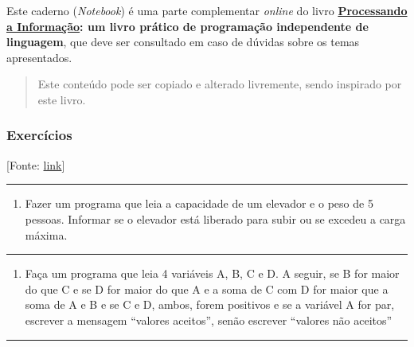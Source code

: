\documentclass[12pt,a4paper]{article}
\renewcommand{\linethickness}{0.05em}
\providecommand{\tightlist}{%
      \setlength{\itemsep}{0pt}\setlength{\parskip}{0pt}}
\begin{document}
Este caderno (\emph{Notebook}) é uma parte complementar \emph{online} do
livro
\textbf{\href{https://editora.ufabc.edu.br/matematica-e-ciencias-da-computacao/58-processando-a-informacao}{Processando
a Informação}: um livro prático de programação independente de
linguagem}, que deve ser consultado em caso de dúvidas sobre os temas
apresentados.

\begin{quote}
Este conteúdo pode ser copiado e alterado livremente, sendo inspirado
por este livro.
\end{quote}

    \hypertarget{exercuxedcios}{%
\subsubsection{Exercícios}\label{exercuxedcios}}

{[}Fonte:
\href{https://www.studocu.com/pt-br/document/universidade-estadual-da-paraiba/algoritmos/tarefas-obrigatorias/lista-de-exercicio-respondido-em-python-estrutura-condicional/4958982/view}{link}{]}

    \begin{center}\rule{0.5\linewidth}{\linethickness}\end{center}

\begin{enumerate}
\def\labelenumi{\arabic{enumi}.}
\tightlist
\item
  Fazer um programa que leia a capacidade de um elevador e o peso de 5
  pessoas. Informar se o elevador está liberado para subir ou se excedeu
  a carga máxima.
\end{enumerate}

    \begin{center}\rule{0.5\linewidth}{\linethickness}\end{center}

\begin{enumerate}
\def\labelenumi{\arabic{enumi}.}
\setcounter{enumi}{1}
\tightlist
\item
  Faça um programa que leia 4 variáveis A, B, C e D. A seguir, se B for
  maior do que C e se D for maior do que A e a soma de C com D for maior
  que a soma de A e B e se C e D, ambos, forem positivos e se a variável
  A for par, escrever a mensagem ``valores aceitos'', senão escrever
  ``valores não aceitos''
\end{enumerate}

    \begin{center}\rule{0.5\linewidth}{\linethickness}\end{center}
\end{document}
